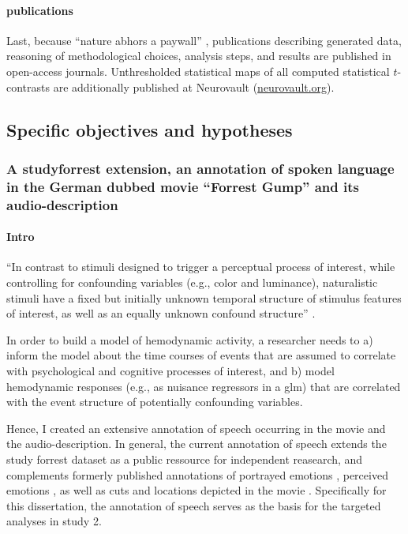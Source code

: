 \paragraph{publications}
Last, because ``nature abhors a paywall'' \citep{dupre2020nature}, publications
describing generated data, reasoning of methodological choices, analysis steps,
and results are published in open-access journals.
Unthresholded statistical maps of all computed statistical $t$-contrasts are
additionally published at Neurovault
(\href{https://neurovault.org/}{neurovault.org}).


\subsection{Specific objectives and hypotheses}



\subsubsection{A studyforrest extension, an annotation of spoken language in the
German dubbed movie ``Forrest Gump'' and its audio-description}


\paragraph{Intro}


``In contrast to stimuli designed to trigger a perceptual process of interest,
while controlling for confounding variables (e.g., color and luminance),
naturalistic stimuli have a fixed but initially unknown temporal structure of
stimulus features of interest, as well as an equally unknown confound
structure'' \citep{haeusler2021speechanno}.

%
In order to build a model of hemodynamic activity, a researcher needs to a)
inform the model about the time courses of events that are assumed to correlate
with psychological and cognitive processes of interest, and b) model hemodynamic
responses (e.g., as nuisance regressors in a \ac{glm}) that are correlated with
the event structure of potentially confounding variables.

%
Hence, I created an extensive annotation of speech occurring in the movie and
the audio-description.
%
In general, the current annotation of speech extends the study forrest dataset
as a public ressource for independent reasearch, and complements formerly
published annotations of portrayed emotions \citep{labs2015portrayed}, perceived
emotions \citep{lettieri2019emotionotopy}, as well as cuts and locations
depicted in the movie \citep{haeusler2016cutanno}.
%
Specifically for this dissertation, the annotation of speech serves as the basis
for the targeted analyses in study 2.


